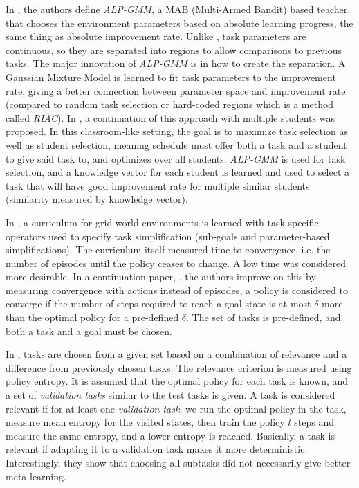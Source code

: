 \documentclass[letterpaper]{article}
\theoremstyle{definition}
\begin{document}
In \cite{Portelas2019}, the authors define \textit{ALP-GMM}, a MAB (Multi-Armed Bandit) based teacher, that chooses the environment parameters based on absolute learning progress, the same thing as absolute improvement rate.
Unlike \cite{Matiisen2020}, task parameters are continuous, so they are separated into regions to allow comparisons to previous tasks. The major innovation of \textit{ALP-GMM} is in how to create the separation. A Gaussian Mixture Model is learned to fit task parameters to the improvement rate, giving a better connection between parameter space and improvement rate (compared to random task selection or hard-coded regions which is a method called \textit{RIAC}).
In \cite{Portelas2020}, a continuation of this approach with multiple students was proposed. In this classroom-like setting, the goal is to maximize task selection as well as student selection, meaning schedule must offer both a task and a student to give said task to, and optimizes over all students. \textit{ALP-GMM} is used for task selection, and a knowledge vector for each student is learned and used to select a task that will have good improvement rate for multiple similar students (similarity measured by knowledge vector).

In \cite{Narvekar2019}, a curriculum for grid-world environments is learned with task-specific operators used to specify task simplification (sub-goals and parameter-based simplifications). The curriculum itself measured time to convergence, i.e. the number of episodes until the policy ceases to change. A low time was considered more desirable.
In a continuation paper, \cite{Narvekar2020}, the authors improve on this by measuring convergence with actions instead of episodes, a policy is considered to converge if the number of steps required to reach a goal state is at most $\delta$ more than the optimal policy for a pre-defined $\delta$. The set of tasks is pre-defined, and both a task and a goal must be chosen.

In \cite{Gutierrez2020}, tasks are chosen from a given set based on a combination of relevance and a difference from previously chosen tasks. The relevance criterion is measured using policy entropy. It is assumed that the optimal policy for each task is known, and a set of \textit{validation tasks} similar to the test tasks is given.
A task is considered relevant if for at least one \textit{validation task}, we run the optimal policy in the task, measure mean entropy for the visited states, then train the policy $l$ steps and measure the same entropy, and a lower entropy is reached. Basically, a task is relevant if adapting it to a validation task makes it more deterministic.
Interestingly, they show that choosing all subtasks did not necessarily give better meta-learning.
\end{document}
